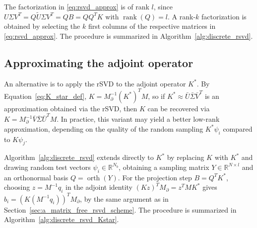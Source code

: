 The factorization in \eqref{eq:rsvd_approx} is of rank $l$, since $U \Sigma V^T = Q \tilde U \Sigma V^T = Q B = Q Q^T K$ with $\operatorname{rank}(Q) = l$. A rank-$k$ factorization is obtained by selecting the $k$ first columns of the respective matrices in \eqref{eq:rsvd_approx}. The procedure is summarized in Algorithm~\ref{alg:discrete_rsvd}.



\subsection{Approximating the adjoint operator}
An alternative is to apply the rSVD to the adjoint operator $K^*$. By Equation~\eqref{eq:K_star_def}, $K = M_\partial^{-1} (K^*)^T M$, so if $K^* \approx \bar U \bar \Sigma \bar V^T$ is an approximation obtained via the rSVD, then $K$ can be recovered via $K = M_\partial^{-1} \bar V \bar \Sigma \bar U^T M$. In practice, this variant may yield a better low-rank approximation, depending on the quality of the random sampling $K^* \psi_i$ compared to $K \psi_j$.

Algorithm~\ref{alg:discrete_rsvd} extends directly to $K^*$ by replacing $K$ with $K^*$ and drawing random test vectors $\psi_i \in \mathbb{R}^{N_b}$, obtaining a sampling matrix $Y \in \mathbb{R}^{N \times l}$ and an orthonormal basis $Q = \operatorname{orth}(Y)$. For the projection step $B = Q^T K^*$, choosing $z = M^{-1}q_i$ in the adjoint identity $(K z)^T M_\partial = z^T M K^*$ gives $b_i = (K(M^{-1}q_i))^T M_\partial$, by the same argument as in Section~\ref{sec:a_matrix_free_rsvd_scheme}. The procedure is summarized in Algorithm~\ref{alg:discrete_rsvd_Kstar}.



